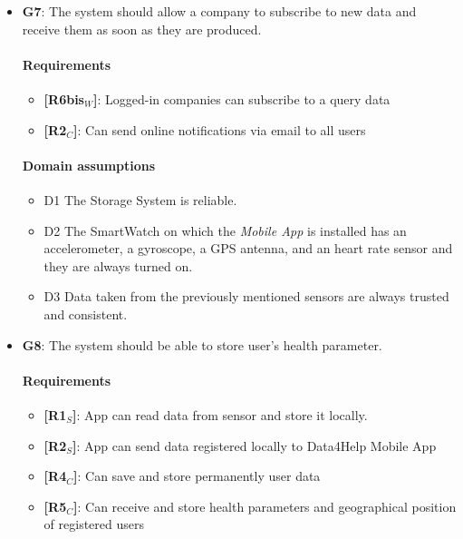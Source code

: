 \begin{itemize}
    \item \textbf{G7}: The system should allow a company to subscribe to new data and receive them as soon as they are produced.
    \paragraph{Requirements}
   \begin{itemize}
       \item \textbf{[R6bis$_W$]}: Logged-in companies can subscribe to a query data
       \item \textbf{[R2$_C$]}: Can send online notifications via email to all users
   \end{itemize}
   \paragraph{Domain assumptions}
   \begin{itemize}
        \item  D1  The Storage System is reliable.
    
        \item  D2  The SmartWatch on which the \textit{Mobile App} is installed has an accelerometer, a gyroscope, a GPS antenna, and an heart rate sensor and they are always turned on.
    
        \item  D3  Data taken from the previously mentioned sensors are always trusted and consistent.
   \end{itemize}
   
    \item \textbf{G8}: The system should be able to store user's health parameter.
    \paragraph{Requirements}
   \begin{itemize}
       \item \textbf{[R1$_S$]}: App can read data from sensor and store it locally.
        \item \textbf{[R2$_S$]}: App can send data registered locally to Data4Help Mobile App
        \item \textbf{[R4$_C$]}: Can save and store permanently user data
    \item \textbf{[R5$_C$]}: Can receive and store health parameters and geographical position of registered users

   \end{itemize}

\end{itemize}
